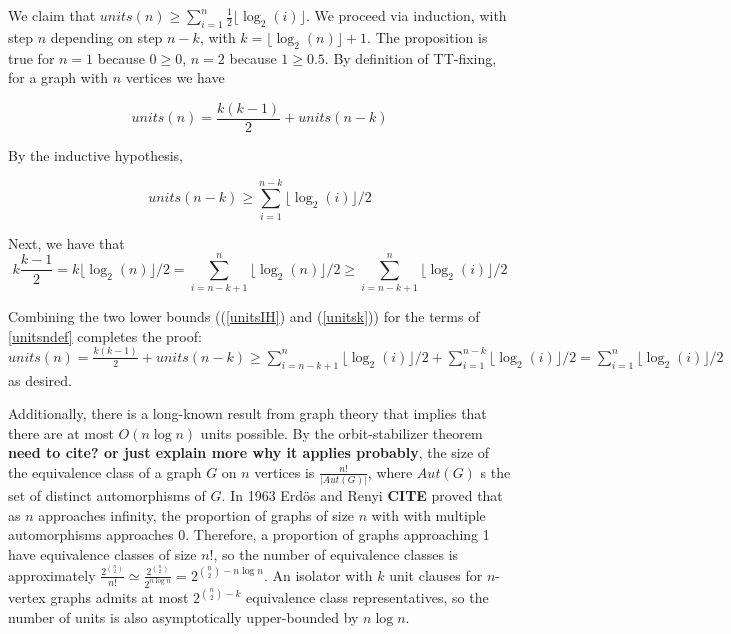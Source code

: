 \documentclass[a4paper,UKenglish,cleveref, autoref, thm-restate]{lipics-v2021}
\begin{document}
We claim that $units(n) \geq \sum\limits_{i=1}^n \frac{1}{2} \lfloor \log_2(i) \rfloor$. We proceed via induction, with step $n$ depending on step $n-k$, with $k=\lfloor \log_2(n)\rfloor + 1$. The proposition is true for $n=1$ because $0 \geq 0$, $n=2$ because $ 1 \geq 0.5$.  By definition of TT-fixing, for a graph with $n$ vertices we have 

\begin{equation}\label{unitsndef}
units(n) = \frac{k(k-1)}{2}  + units(n-k)
\end{equation} 

By the inductive hypothesis,

 \begin{equation}\label{unitsIH}
 units(n-k) \geq \sum\limits_{i=1}^{n-k} \lfloor \log_2(i)\rfloor/2
 \end{equation}
 
 Next, we have that 
 \begin{equation}\label{unitsk}
 k\frac{k-1}{2} = k \lfloor \log_2(n)\rfloor/2 = \sum\limits_{i=n-k+1}^{n} \lfloor \log_2(n)\rfloor/2 \geq \sum\limits_{i=n-k+1}^{n} \lfloor \log_2(i)\rfloor/2
 \end{equation}
 
 Combining the two lower bounds ((\ref{unitsIH}) and (\ref{unitsk})) for the terms of \cref{unitsndef} completes the proof: $units(n) = \frac{k(k-1)}{2} + units(n-k) \geq \sum\limits_{i=n-k+1}^{n} \lfloor \log_2(i)\rfloor/2 + \sum\limits_{i=1}^{n-k} \lfloor \log_2(i)\rfloor/2 = \sum\limits_{i=1}^{n} \lfloor \log_2(i)\rfloor/2$ as desired.

Additionally, there is a long-known result from graph theory that implies that there are at most $O(n\log n)$ units possible. By the orbit-stabilizer theorem \textbf{need to cite? or just explain more why it applies probably}, the size of the equivalence class of a graph $G$ on $n$ vertices is $\frac{n!}{|Aut(G)|}$, where $Aut(G)$ s the set of distinct automorphisms of $G$. In 1963 Erd\"os and Renyi \textbf{CITE} proved that as $n$ approaches infinity, the proportion of graphs of size $n$ with with multiple automorphisms approaches 0. Therefore, a proportion of graphs approaching 1 have equivalence classes of size $n!$, so the number of equivalence classes is approximately $\frac{2^{n \choose 2}}{n!} \simeq \frac{2^{n \choose 2}}{2^{n\log n}} = 2^{{n \choose 2} - n\log n}$. An isolator with $k$ unit clauses for $n$-vertex graphs admits at most $2^{{n \choose 2} - k}$ equivalence class representatives, so the number of units is also asymptotically upper-bounded by $n \log n$.
\end{document}
